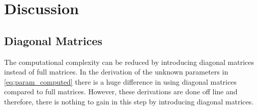 \chapter{Discussion} %
\label{cha:discussion}

\section{Diagonal Matrices} %
\label{sec:diagonal_matrices}
The computational complexity can be reduced by introducing diagonal matrices instead of full matrices. In the derivation of the unknown parameters in \eqref{eq:param_computed} there is a huge difference in using diagonal matrices compared to full matrices. However, these derivations are done off line and therefore, there is nothing to gain in this step by introducing diagonal matrices.

% 
% 

